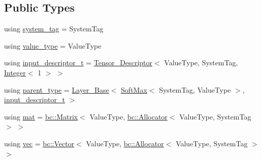\subsection*{Public Types}
\begin{DoxyCompactItemize}
\item 
using \hyperlink{structbc_1_1nn_1_1SoftMax_a7a97d15ba35c8cb9de0322b8b446bc46}{system\+\_\+tag} = System\+Tag
\item 
using \hyperlink{structbc_1_1nn_1_1SoftMax_a7e53ef1c3b39ca65afa99d237b9353fa}{value\+\_\+type} = Value\+Type
\item 
using \hyperlink{structbc_1_1nn_1_1SoftMax_acb201cfe27da9360a1b121e7d9ab190a}{input\+\_\+descriptor\+\_\+t} = \hyperlink{structbc_1_1nn_1_1Tensor__Descriptor}{Tensor\+\_\+\+Descriptor}$<$ Value\+Type, System\+Tag, \hyperlink{structbc_1_1traits_1_1Integer}{Integer}$<$ 1 $>$ $>$
\item 
using \hyperlink{structbc_1_1nn_1_1SoftMax_afebb15c21a42f0eb4bb355c726a5a0d5}{parent\+\_\+type} = \hyperlink{structbc_1_1nn_1_1Layer__Base}{Layer\+\_\+\+Base}$<$ \hyperlink{structbc_1_1nn_1_1SoftMax}{Soft\+Max}$<$ System\+Tag, Value\+Type $>$, \hyperlink{structbc_1_1nn_1_1SoftMax_acb201cfe27da9360a1b121e7d9ab190a}{input\+\_\+descriptor\+\_\+t} $>$
\item 
using \hyperlink{structbc_1_1nn_1_1SoftMax_ae3dde4631e85a7be9c8578e70f642dd5}{mat} = \hyperlink{namespacebc_a92dd1e243183b382432a5fac3ed8b89f}{bc\+::\+Matrix}$<$ Value\+Type, \hyperlink{classbc_1_1allocators_1_1Allocator}{bc\+::\+Allocator}$<$ Value\+Type, System\+Tag $>$ $>$
\item 
using \hyperlink{structbc_1_1nn_1_1SoftMax_acb0aee6fde514718c2f26eb711a0b710}{vec} = \hyperlink{namespacebc_a14d40e8e95957f92a57853921837a15d}{bc\+::\+Vector}$<$ Value\+Type, \hyperlink{classbc_1_1allocators_1_1Allocator}{bc\+::\+Allocator}$<$ Value\+Type, System\+Tag $>$ $>$
\end{DoxyCompactItemize}
